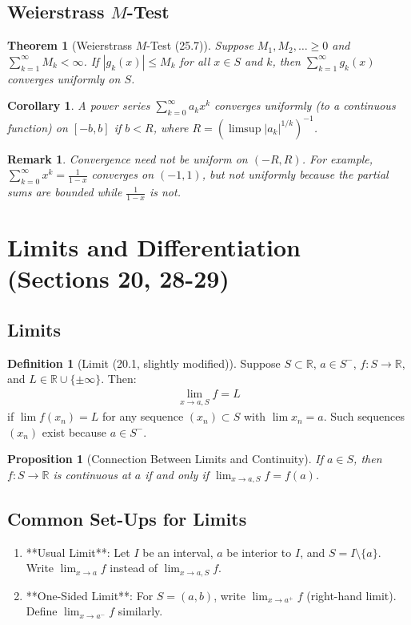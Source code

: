 \documentclass[9pt]{article}
\theoremstyle{definition}
\newtheorem{definition}{Definition}
\theoremstyle{plain}
\newtheorem{theorem}{Theorem}
\newtheorem{proposition}{Proposition}
\newtheorem{corollary}{Corollary}
\newtheorem{remark}{Remark}
\begin{document}
\subsection*{Weierstrass $ M $-Test}
\begin{theorem}[Weierstrass $ M $-Test (25.7)]
Suppose $ M_1, M_2, \ldots \geq 0 $ and $ \sum_{k=1}^\infty M_k < \infty $. If $ |g_k(x)| \leq M_k $ for all $ x \in S $ and $ k $, then $ \sum_{k=1}^\infty g_k(x) $ converges uniformly on $ S $.
\end{theorem}

\begin{corollary}
A power series $ \sum_{k=0}^\infty a_k x^k $ converges uniformly (to a continuous function) on $ [-b, b] $ if $ b < R $, where $ R = (\limsup |a_k|^{1/k})^{-1} $.
\end{corollary}

\begin{remark}
Convergence need not be uniform on $ (-R, R) $. For example, $ \sum_{k=0}^\infty x^k = \frac{1}{1-x} $ converges on $ (-1, 1) $, but not uniformly because the partial sums are bounded while $ \frac{1}{1-x} $ is not.
\end{remark}
\section*{Limits and Differentiation (Sections 20, 28-29)}

\subsection*{Limits}
\begin{definition}[Limit (20.1, slightly modified)]
Suppose $ S \subset \mathbb{R} $, $ a \in S^- $, $ f : S \to \mathbb{R} $, and $ L \in \mathbb{R} \cup \{\pm \infty\} $. Then:
\begin{align}
\lim_{x \to a, S} f = L
\end{align}
if $ \lim f(x_n) = L $ for any sequence $ (x_n) \subset S $ with $ \lim x_n = a $. Such sequences $ (x_n) $ exist because $ a \in S^- $.
\end{definition}

\begin{proposition}[Connection Between Limits and Continuity]
If $ a \in S $, then $ f : S \to \mathbb{R} $ is continuous at $ a $ if and only if $ \lim_{x \to a, S} f = f(a) $.
\end{proposition}

\subsection*{Common Set-Ups for Limits}
\begin{enumerate}
    \item **Usual Limit**: Let $ I $ be an interval, $ a $ be interior to $ I $, and $ S = I \setminus \{a\} $. Write $ \lim_{x \to a} f $ instead of $ \lim_{x \to a, S} f $.
    \item **One-Sided Limit**: For $ S = (a, b) $, write $ \lim_{x \to a^+} f $ (right-hand limit). Define $ \lim_{x \to a^-} f $ similarly.
\end{enumerate}
\end{document}
